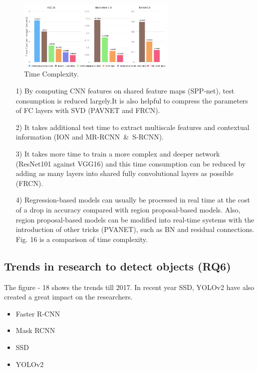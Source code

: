 \documentclass[two column]{ieeeaccess}
\begin{document}
\begin{figure}[h]
    \centering
    \includegraphics[width=3in]{q5.PNG}
    \caption{Time Complexity.}
    \label{fig17}
\end{figure}
\begin{itemize}

\item[1)] 
By computing CNN features on shared feature maps
(SPP-net), test consumption is reduced largely.It is also helpful
to compress the parameters of FC layers with SVD
(PAVNET and FRCN).

\item[2)] 
It takes additional test time to extract multiscale features
and contextual information (ION and MR-RCNN~\&~S-RCNN).

\item[3)] 
It takes more time to train a more complex and deeper
network (ResNet101 against VGG16) and this time
consumption can be reduced by adding as many layers
into shared fully convolutional layers as possible
(FRCN).

\item[4)] 
Regression-based models can usually be processed
in real time at the cost of a drop in accuracy
compared with region proposal-based models. Also,
region proposal-based models can be modified into
real-time systems with the introduction of other
tricks (PVANET), such as BN and residual
connections.
Fig. 16 is a comparison of time complexity.
\end{itemize}

\subsection{Trends in research to detect objects (RQ6)}
The  figure - 18 shows the trends till 2017. In recent year SSD, YOLOv2 have also created a great impact on the researchers.
\begin{itemize}
    
    \item Faster R-CNN
    
    \item Mask RCNN
    
    \item SSD
    
    \item YOLOv2
\end{itemize}
\end{document}
